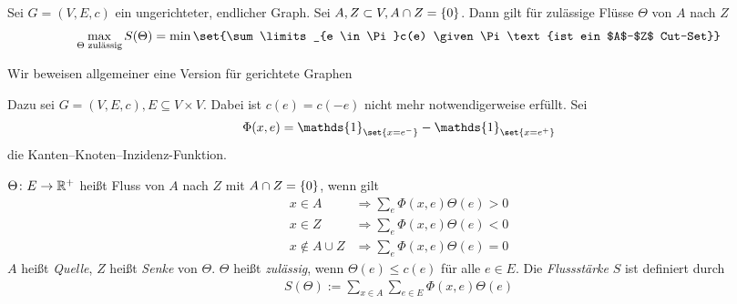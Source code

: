 \begin{satz}
	Sei $G = (V,E,c)$ ein ungerichteter, endlicher Graph. Sei $A,Z \subset V, A \cap Z = \{0\}$. Dann gilt für zulässige Flüsse $\Theta$ von $A$ nach $Z$
	\begin{align}
		\max\limits_{\Theta \text{ zulässig}} S(\Theta) = \min \set{\sum\limits_{e \in \Pi}c(e) \given \Pi \text{ist ein $A$--$Z$ Cut--Set}}
	\end{align}
\end{satz}
Wir beweisen allgemeiner eine Version für gerichtete Graphen
\begin{beweis}
	Dazu sei $G = (V,E,c), E \subseteq V \times V$. Dabei ist $c(e) = c(-e)$ nicht mehr notwendigerweise erfüllt. Sei
	\begin{align}
		\Phi (x,e) = \mathds{1}_{\set{x = e^-}}- \mathds{1}_{\set{x = e^+}}
	\end{align}
	die Kanten--Knoten--Inzidenz-Funktion.

\end{beweis}
\begin{definition}
	$\Theta\colon E \to \mathbb{R}^+$ heißt Fluss von $A$ nach $Z$ mit $A \cap Z = \{0\}$, wenn gilt
	\begin{align}
		x \in A &\Rightarrow \sum\limits_{e} \Phi(x,e) \Theta(e) > 0 \\
		x \in Z &\Rightarrow \sum\limits_{e} \Phi(x,e) \Theta(e) < 0 \\
		x \notin A \cup Z &\Rightarrow \sum\limits_{e} \Phi(x,e) \Theta(e) = 0
	\end{align}
	$A$ heißt \emph{Quelle}, $Z$ heißt \emph{Senke} von $\Theta$. $\Theta$ heißt \emph{zulässig}, wenn $\Theta(e) \leq c(e)$ für alle $e \in E$. Die \emph{Flussstärke} $S$ ist definiert durch
	\begin{align}
		S(\Theta):= \sum\limits_{x \in A} \sum\limits_{e \in E} \Phi(x,e) \Theta(e)
	\end{align}
\end{definition}
	
